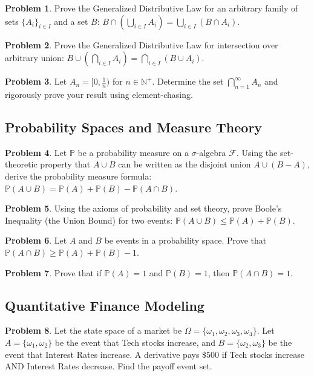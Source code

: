 \documentclass[12pt]{article}
\theoremstyle{definition}
\newtheorem{problem}{Problem}
\begin{document}
\begin{problem}
Prove the Generalized Distributive Law for an arbitrary family of sets $\{A_i\}_{i \in I}$ and a set $B$: $B \cap \left(\bigcup_{i \in I} A_i\right) = \bigcup_{i \in I} (B \cap A_i)$.
\end{problem}

\begin{problem}
Prove the Generalized Distributive Law for intersection over arbitrary union: $B \cup \left(\bigcap_{i \in I} A_i\right) = \bigcap_{i \in I} (B \cup A_i)$.
\end{problem}

\begin{problem}
Let $A_n = [0, \frac{1}{n})$ for $n \in \mathbb{N}^+$. Determine the set $\bigcap_{n=1}^\infty A_n$ and rigorously prove your result using element-chasing.
\end{problem}

\subsection{Probability Spaces and Measure Theory}
\begin{problem}
Let $\mathbb{P}$ be a probability measure on a $\sigma$-algebra $\mathcal{F}$. Using the set-theoretic property that $A \cup B$ can be written as the disjoint union $A \cup (B - A)$, derive the probability measure formula: $\mathbb{P}(A \cup B) = \mathbb{P}(A) + \mathbb{P}(B) - \mathbb{P}(A \cap B)$.
\end{problem}

\begin{problem}
Using the axioms of probability and set theory, prove Boole's Inequality (the Union Bound) for two events: $\mathbb{P}(A \cup B) \le \mathbb{P}(A) + \mathbb{P}(B)$.
\end{problem}

\begin{problem}
Let $A$ and $B$ be events in a probability space. Prove that $\mathbb{P}(A \cap B) \ge \mathbb{P}(A) + \mathbb{P}(B) - 1$.
\end{problem}

\begin{problem}
Prove that if $\mathbb{P}(A) = 1$ and $\mathbb{P}(B) = 1$, then $\mathbb{P}(A \cap B) = 1$.
\end{problem}

\subsection{Quantitative Finance Modeling}
\begin{problem}
Let the state space of a market be $\Omega = \{\omega_1, \omega_2, \omega_3, \omega_4\}$. Let $A = \{\omega_1, \omega_2\}$ be the event that Tech stocks increase, and $B = \{\omega_2, \omega_3\}$ be the event that Interest Rates increase. A derivative pays $\$500$ if Tech stocks increase AND Interest Rates decrease. Find the payoff event set.
\end{problem}
\end{document}
